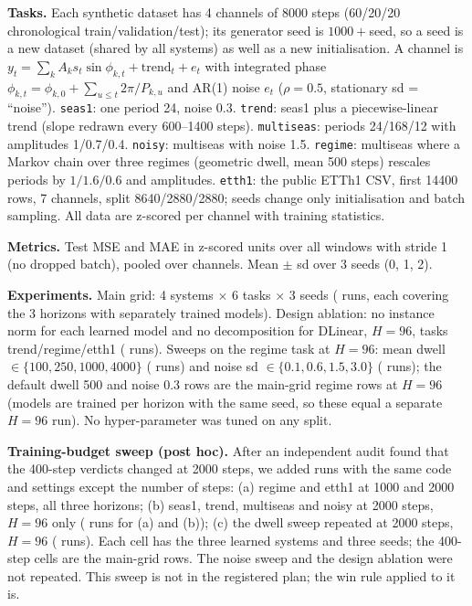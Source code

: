 \textbf{Tasks.} Each synthetic dataset has 4 channels of 8000 steps (60/20/20 chronological train/validation/test); its generator seed is $1000+$seed, so a seed is a new dataset (shared by all systems) as well as a new initialisation. A channel is $y_t=\sum_k A_k s_t\sin\phi_{k,t}+\text{trend}_t+e_t$ with integrated phase $\phi_{k,t}=\phi_{k,0}+\sum_{u\le t}2\pi/P_{k,u}$ and AR(1) noise $e_t$ ($\rho=0.5$, stationary sd = ``noise''). \texttt{seas1}: one period 24, noise 0.3. \texttt{trend}: seas1 plus a piecewise-linear trend (slope redrawn every 600--1400 steps). \texttt{multiseas}: periods 24/168/12 with amplitudes 1/0.7/0.4. \texttt{noisy}: multiseas with noise 1.5. \texttt{regime}: multiseas where a Markov chain over three regimes (geometric dwell, mean 500 steps) rescales periods by $1/1.6/0.6$ and amplitudes. \texttt{etth1}: the public ETTh1 CSV, first 14400 rows, 7 channels, split 8640/2880/2880; seeds change only initialisation and batch sampling. All data are z-scored per channel with training statistics.

\textbf{Metrics.} Test MSE and MAE in z-scored units over all windows with stride 1 (no dropped batch), pooled over channels. Mean $\pm$ sd over 3 seeds (0, 1, 2).

\textbf{Experiments.} Main grid: 4 systems $\times$ 6 tasks $\times$ 3 seeds ( runs, each covering the 3 horizons with separately trained models). Design ablation: no instance norm for each learned model and no decomposition for DLinear, $H=96$, tasks trend/regime/etth1 ( runs). Sweeps on the regime task at $H=96$: mean dwell $\in\{100,250,1000,4000\}$ ( runs) and noise sd $\in\{0.1,0.6,1.5,3.0\}$ ( runs); the default dwell 500 and noise 0.3 rows are the main-grid regime rows at $H=96$ (models are trained per horizon with the same seed, so these equal a separate $H=96$ run). No hyper-parameter was tuned on any split.

\textbf{Training-budget sweep (post hoc).} After an independent audit found that the 400-step verdicts changed at 2000 steps, we added runs with the same code and settings except the number of steps: (a) regime and etth1 at 1000 and 2000 steps, all three horizons; (b) seas1, trend, multiseas and noisy at 2000 steps, $H=96$ only ( runs for (a) and (b)); (c) the dwell sweep repeated at 2000 steps, $H=96$ ( runs). Each cell has the three learned systems and three seeds; the 400-step cells are the main-grid rows. The noise sweep and the design ablation were not repeated. This sweep is not in the registered plan; the win rule applied to it is.

